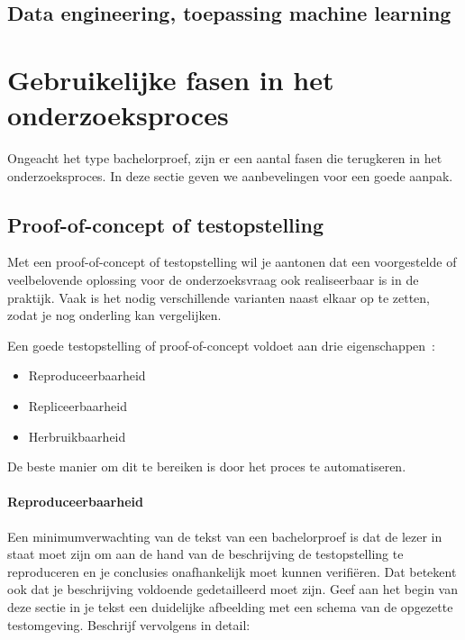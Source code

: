 \subsection{Data engineering, toepassing machine learning}%
\label{ssec:data-engineering-ml}


\section{Gebruikelijke fasen in het onderzoeksproces}%

Ongeacht het type bachelorproef, zijn er een aantal fasen die terugkeren in het onderzoeksproces. In deze sectie geven we aanbevelingen voor een goede aanpak.

\subsection{Proof-of-concept of testopstelling}%
\label{ssec:poc-testopstelling}

Met een proof-of-concept of testopstelling wil je aantonen dat een voorgestelde of veelbelovende oplossing voor de onderzoeksvraag ook realiseerbaar is in de praktijk. Vaak is het nodig verschillende varianten naast elkaar op te zetten, zodat je nog onderling kan vergelijken.

Een goede testopstelling of proof-of-concept voldoet aan drie eigenschappen~\autocite{Liberman2015}:

\begin{itemize}
  \item Reproduceerbaarheid
  \item Repliceerbaarheid
  \item Herbruikbaarheid 
\end{itemize}

De beste manier om dit te bereiken is door het proces te automatiseren.

\paragraph{Reproduceerbaarheid}%

Een minimumverwachting van de tekst van een bachelorproef is dat de lezer in staat moet zijn om aan de hand van de beschrijving de testopstelling te reproduceren en je conclusies onafhankelijk moet kunnen verifiëren. Dat betekent ook dat je beschrijving voldoende gedetailleerd moet zijn. Geef aan het begin van deze sectie in je tekst een duidelijke afbeelding met een schema van de opgezette testomgeving. Beschrijf vervolgens in detail:

